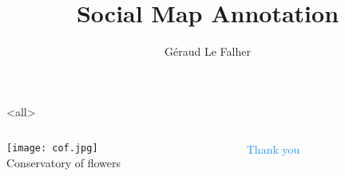 \documentclass[final,logo=yellowexc,nofoot,fleqn,svgnames]{aaltoslides}
\title{Social Map Annotation}
\author{Géraud Le Falher}
\institute{November 26, 2013}
\date{}
\begin{document}
\aaltotitleframe

\mode<all>

\mode*


\begin{frame}[plain]

  \begin{columns}
    \begin{column}{0.8\textwidth}
      \begin{center}
        \texttt{[image: cof.jpg]}          
	\\ {\small Conservatory of flowers}
      \end{center}
    \end{column}
    \begin{column}{0.35\textwidth}
      \begin{center}
	      \baselineskip 10.0mm
	      \textcolor{DodgerBlue}{\Huge Thank you}
      \end{center}    

    \end{column}
  \end{columns}

\end{frame}
\end{document}
